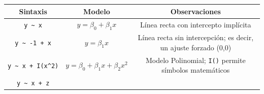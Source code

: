 \documentclass[]{book}
\begin{document}
\begin{longtable}[]{@{}ccc@{}}
\toprule
\begin{minipage}[b]{0.17\columnwidth}\centering\strut
\textbf{Sintaxis}\strut
\end{minipage} & \begin{minipage}[b]{0.28\columnwidth}\centering\strut
\textbf{Modelo}\strut
\end{minipage} & \begin{minipage}[b]{0.46\columnwidth}\centering\strut
\textbf{Observaciones}\strut
\end{minipage}\tabularnewline
\midrule
\endhead
\begin{minipage}[t]{0.17\columnwidth}\centering\strut
\texttt{y\ \textasciitilde{}\ x}\strut
\end{minipage} & \begin{minipage}[t]{0.28\columnwidth}\centering\strut
\(y = \beta_0+\beta_1x\)\strut
\end{minipage} & \begin{minipage}[t]{0.46\columnwidth}\centering\strut
Línea recta con intercepto implícita\strut
\end{minipage}\tabularnewline
\begin{minipage}[t]{0.17\columnwidth}\centering\strut
\texttt{y\ \textasciitilde{}\ -1\ +\ x}\strut
\end{minipage} & \begin{minipage}[t]{0.28\columnwidth}\centering\strut
\(y = \beta_1x\)\strut
\end{minipage} & \begin{minipage}[t]{0.46\columnwidth}\centering\strut
Línea recta sin intercepción; es decir, un ajuste forzado (0,0)\strut
\end{minipage}\tabularnewline
\begin{minipage}[t]{0.17\columnwidth}\centering\strut
\texttt{y\ \textasciitilde{}\ x\ +\ I(x\^{}2)}\strut
\end{minipage} & \begin{minipage}[t]{0.28\columnwidth}\centering\strut
\(y = \beta_0+\beta_1x+\beta_2x^2\)\strut
\end{minipage} & \begin{minipage}[t]{0.46\columnwidth}\centering\strut
Modelo Polinomial; \texttt{I()} permite símbolos matemáticos\strut
\end{minipage}\tabularnewline
\begin{minipage}[t]{0.17\columnwidth}\centering\strut
\texttt{y\ \textasciitilde{}\ x\ +\ z}\strut
\end{minipage} & \begin{minipage}[t]{0.28\columnwidth}\centering\strut

\end{minipage}
\end{longtable}
\end{document}
